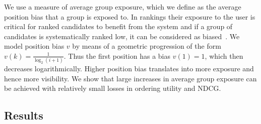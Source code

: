  We use a measure of average group exposure, which we define as the average position bias that a group is exposed to. 
%
In rankings their exposure to the user is critical for ranked candidates to benefit from the system and if a group of candidates is systematically ranked low, it can be considered as biased~\cite{friedman1996bias}. 
%
We model position bias $v$ by means of a geometric progression of the form $v(k) = \frac{1}{\log_2(i+1)}$. 
%
Thus the first position has a bias $v(1)=1$, which then decreases logarithmically.
%
Higher position bias translates into more exposure and hence more visibility.
%
We show that large increases in average group exposure can be achieved with relatively small losses in ordering utility and NDCG.

\subsection{Results}\label{sec:experiments-results}
%
